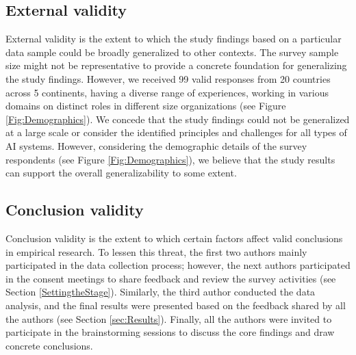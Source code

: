 \subsection{External validity}
External validity is the extent to which the study findings based on a particular data sample could be broadly generalized to other contexts. The survey sample size might not be representative to provide a concrete foundation for generalizing the study findings. However, we received 99 valid responses from 20 countries across 5 continents, having a diverse range of experiences, working in various domains on distinct roles in different size organizations (see Figure \ref{Fig:Demographics}). We concede that the study findings could not be generalized at a large scale or consider the identified principles and challenges for all types of AI systems. However, considering the demographic details of the survey respondents (see Figure \ref{Fig:Demographics}), we believe that the study results can support the overall generalizability to some extent.   
\subsection{Conclusion validity}
Conclusion validity is the extent to which certain factors affect valid conclusions in empirical research. To lessen this threat, the first two authors mainly participated in the data collection process; however, the next authors participated in the consent meetings to share feedback and review the survey activities (see Section \ref{SettingtheStage}). Similarly, the third author conducted the data analysis, and the final results were presented based on the feedback shared by all the authors (see Section \ref{sec:Results}). Finally, all the authors were invited to participate in the brainstorming sessions to discuss the core findings and draw concrete conclusions. 
